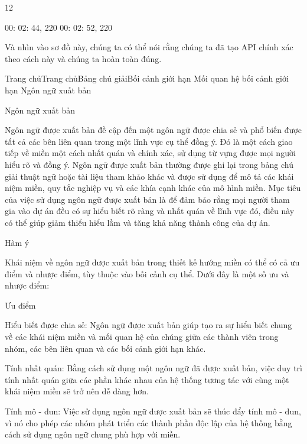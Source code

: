 12

00: 02: 44, 220 00: 02: 52, 220

Và nhìn vào sơ đồ này, chúng ta có thể nói rằng chúng ta đã tạo API chính xác theo cách này và chúng ta hoàn toàn đúng.





Trang chủTrang chủBảng chú giảiBối cảnh giới hạn Mối quan hệ bối cảnh giới hạn Ngôn ngữ xuất bản

Ngôn ngữ xuất bản

Ngôn ngữ được xuất bản đề cập đến một ngôn ngữ được chia sẻ và phổ biến được tất cả các bên liên quan trong một lĩnh vực cụ thể đồng ý. Đó là một cách giao tiếp về miền một cách nhất quán và chính xác, sử dụng từ vựng được mọi người hiểu rõ và đồng ý. Ngôn ngữ được xuất bản thường được ghi lại trong bảng chú giải thuật ngữ hoặc tài liệu tham khảo khác và được sử dụng để mô tả các khái niệm miền, quy tắc nghiệp vụ và các khía cạnh khác của mô hình miền. Mục tiêu của việc sử dụng ngôn ngữ được xuất bản là để đảm bảo rằng mọi người tham gia vào dự án đều có sự hiểu biết rõ ràng và nhất quán về lĩnh vực đó, điều này có thể giúp giảm thiểu hiểu lầm và tăng khả năng thành công của dự án.

Hàm ý

Khái niệm về ngôn ngữ được xuất bản trong thiết kế hướng miền có thể có cả ưu điểm và nhược điểm, tùy thuộc vào bối cảnh cụ thể. Dưới đây là một số ưu và nhược điểm:

Ưu điểm

Hiểu biết được chia sẻ: Ngôn ngữ được xuất bản giúp tạo ra sự hiểu biết chung về các khái niệm miền và mối quan hệ của chúng giữa các thành viên trong nhóm, các bên liên quan và các bối cảnh giới hạn khác.

Tính nhất quán: Bằng cách sử dụng một ngôn ngữ đã được xuất bản, việc duy trì tính nhất quán giữa các phần khác nhau của hệ thống tương tác với cùng một khái niệm miền sẽ trở nên dễ dàng hơn.

Tính mô - đun: Việc sử dụng ngôn ngữ được xuất bản sẽ thúc đẩy tính mô - đun, vì nó cho phép các nhóm phát triển các thành phần độc lập của hệ thống bằng cách sử dụng ngôn ngữ chung phù hợp với miền.

